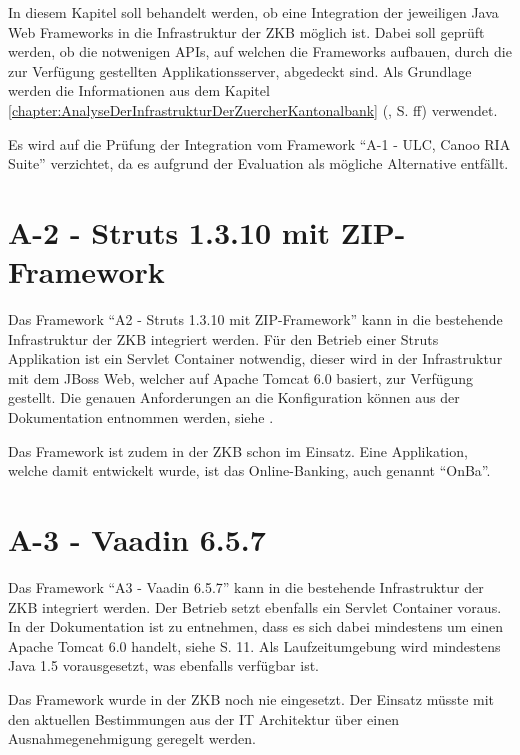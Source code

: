 In diesem Kapitel soll behandelt werden, ob eine Integration der jeweiligen Java
Web Frameworks in die Infrastruktur der \ac{ZKB} möglich ist. Dabei soll geprüft
werden, ob die notwenigen \acp{API}, auf welchen die Frameworks aufbauen, durch
die zur Verfügung gestellten Applikationsserver, abgedeckt sind. Als Grundlage
werden die Informationen aus dem Kapitel
\ref{chapter:AnalyseDerInfrastrukturDerZuercherKantonalbank}
(, S.
\pageref{chapter:AnalyseDerInfrastrukturDerZuercherKantonalbank}ff) verwendet.

Es wird auf die Prüfung der Integration vom Framework ``A-1 - ULC, Canoo RIA
Suite'' verzichtet, da es aufgrund der Evaluation als mögliche Alternative
entfällt.

\section{A-2 - Struts 1.3.10 mit ZIP-Framework}

Das Framework ``A2 - Struts 1.3.10 mit ZIP-Framework'' kann in die bestehende
Infrastruktur der \ac{ZKB} integriert werden. Für den Betrieb einer Struts
Applikation ist ein Servlet Container notwendig, dieser wird in der
Infrastruktur mit dem JBoss Web, welcher auf Apache Tomcat 6.0 basiert, zur
Verfügung gestellt. Die genauen Anforderungen an die Konfiguration können aus
der Dokumentation entnommen werden, siehe \cite{StrutsDokumentation}.

Das Framework ist zudem in der \ac{ZKB} schon im Einsatz. Eine Applikation,
welche damit entwickelt wurde, ist das Online-Banking, auch genannt ``OnBa''.

\section{A-3 - Vaadin 6.5.7}

Das Framework ``A3 - Vaadin 6.5.7'' kann in die bestehende
Infrastruktur der \ac{ZKB} integriert werden. Der Betrieb setzt ebenfalls ein
Servlet Container voraus. In der Dokumentation ist zu entnehmen, dass es sich
dabei mindestens um einen Apache Tomcat 6.0 handelt, siehe \cite{BookOfVaadin}
S. 11. Als Laufzeitumgebung wird mindestens Java 1.5 vorausgesetzt, was
ebenfalls verfügbar ist.

Das Framework wurde in der \ac{ZKB} noch nie eingesetzt. Der Einsatz müsste mit
den aktuellen Bestimmungen aus der IT Architektur über einen Ausnahmegenehmigung
geregelt werden.

